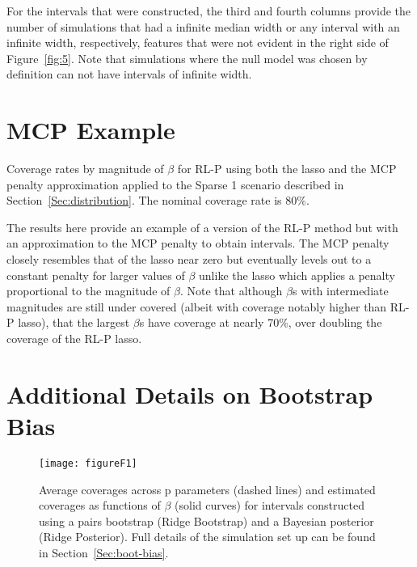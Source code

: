 For the intervals that were constructed, the third and fourth columns provide the number of simulations that had a infinite median width or any interval with an infinite width, respectively, features that were not evident in the right side of Figure~\ref{fig:5}. Note that simulations where the null model was chosen by definition can not have intervals of infinite width.

\clearpage


\section{MCP Example}\label{Sup:MCP}

\begin{table}[hbtp]
  \centering
  
  \caption{\label{tab:E1} Coverage rates by magnitude of $\beta$ for RL-P using both the lasso and the MCP penalty approximation applied to the Sparse 1 scenario described in Section~\ref{Sec:distribution}. The nominal coverage rate is 80\%. }
\end{table}

The results here provide an example of a version of the RL-P method but with an approximation to the MCP penalty to obtain intervals. The MCP penalty closely resembles that of the lasso near zero but eventually levels out to a constant penalty for larger values of $\beta$ unlike the lasso which applies a penalty proportional to the magnitude of $\beta$. Note that although $\beta$s with intermediate magnitudes are still under covered (albeit with coverage notably higher than RL-P lasso), that the largest $\beta$s have coverage at nearly 70\%, over doubling the coverage of the RL-P lasso.

\clearpage

\section{Additional Details on Bootstrap Bias}\label{Sup:proof}

\begin{figure}[htb!]
  \begin{center}
    \texttt{[image: figureF1]}
    \caption{\label{fig:F1} Average coverages across p parameters (dashed lines) and estimated coverages as functions of $\beta$ (solid curves) for intervals constructed using a pairs bootstrap (Ridge Bootstrap) and a Bayesian posterior (Ridge Posterior). Full details of the simulation set up can be found in Section~\ref{Sec:boot-bias}.}
  \end{center}
\end{figure}

